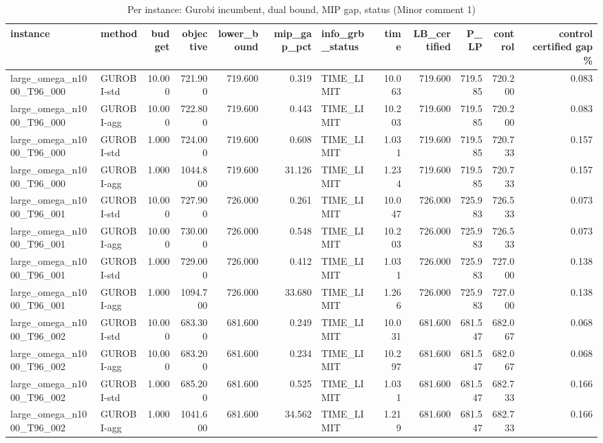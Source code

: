 \begin{table}[htbp]
\centering
\small
\caption{Per instance: Gurobi incumbent, dual bound, MIP gap, status (Minor comment 1)}
\label{tab:E4a_equal_budgets_gurobi_per_instance}
\begin{tabular}{llrrrrlrrrrr}
\toprule
instance & method & budget & objective & lower\_bound & mip\_gap\_pct & info\_grb\_status & time & LB\_certified & P\_LP & control & control certified gap \% \\
\midrule
large\_omega\_n1000\_T96\_000 & GUROBI-std & 10.000 & 721.900 & 719.600 & 0.319 & TIME\_LIMIT & 10.063 & 719.600 & 719.585 & 720.200 & 0.083 \\
large\_omega\_n1000\_T96\_000 & GUROBI-agg & 10.000 & 722.800 & 719.600 & 0.443 & TIME\_LIMIT & 10.203 & 719.600 & 719.585 & 720.200 & 0.083 \\
large\_omega\_n1000\_T96\_000 & GUROBI-std & 1.000 & 724.000 & 719.600 & 0.608 & TIME\_LIMIT & 1.031 & 719.600 & 719.585 & 720.733 & 0.157 \\
large\_omega\_n1000\_T96\_000 & GUROBI-agg & 1.000 & 1044.800 & 719.600 & 31.126 & TIME\_LIMIT & 1.234 & 719.600 & 719.585 & 720.733 & 0.157 \\
large\_omega\_n1000\_T96\_001 & GUROBI-std & 10.000 & 727.900 & 726.000 & 0.261 & TIME\_LIMIT & 10.047 & 726.000 & 725.983 & 726.533 & 0.073 \\
large\_omega\_n1000\_T96\_001 & GUROBI-agg & 10.000 & 730.000 & 726.000 & 0.548 & TIME\_LIMIT & 10.203 & 726.000 & 725.983 & 726.533 & 0.073 \\
large\_omega\_n1000\_T96\_001 & GUROBI-std & 1.000 & 729.000 & 726.000 & 0.412 & TIME\_LIMIT & 1.031 & 726.000 & 725.983 & 727.000 & 0.138 \\
large\_omega\_n1000\_T96\_001 & GUROBI-agg & 1.000 & 1094.700 & 726.000 & 33.680 & TIME\_LIMIT & 1.266 & 726.000 & 725.983 & 727.000 & 0.138 \\
large\_omega\_n1000\_T96\_002 & GUROBI-std & 10.000 & 683.300 & 681.600 & 0.249 & TIME\_LIMIT & 10.031 & 681.600 & 681.547 & 682.067 & 0.068 \\
large\_omega\_n1000\_T96\_002 & GUROBI-agg & 10.000 & 683.200 & 681.600 & 0.234 & TIME\_LIMIT & 10.297 & 681.600 & 681.547 & 682.067 & 0.068 \\
large\_omega\_n1000\_T96\_002 & GUROBI-std & 1.000 & 685.200 & 681.600 & 0.525 & TIME\_LIMIT & 1.031 & 681.600 & 681.547 & 682.733 & 0.166 \\
large\_omega\_n1000\_T96\_002 & GUROBI-agg & 1.000 & 1041.600 & 681.600 & 34.562 & TIME\_LIMIT & 1.219 & 681.600 & 681.547 & 682.733 & 0.166 \\

\end{tabular}
\end{table}
